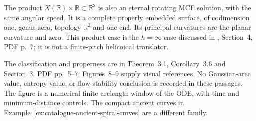 \begin{example}
The product $X(\mathbb R)\times\mathbb R\subset\mathbb R^3$ is also an
eternal rotating MCF solution, with the same angular speed. It is a complete
properly embedded surface, of codimension one, genus zero, topology
$\mathbb R^2$ and one end. Its principal curvatures are the planar curvature
and zero. This product case is the $h=\infty$ case discussed in
\cite{CatHalldorsson2013}, Section~4, PDF p.~7; it is not a finite-pitch
helicoidal translator.

The classification and properness are in Theorem~3.1, Corollary~3.6 and
Section~3, PDF pp.~5--7; Figures~8--9 supply visual references. No Gaussian-area
value, entropy value, or flow-stability conclusion is recorded in these passages.
The figure is a numerical finite arclength window of the ODE, with time and
minimum-distance controls. The compact ancient curves in
Example~\ref{ex:catalogue-ancient-spiral-curves} are a different family.
\end{example}

